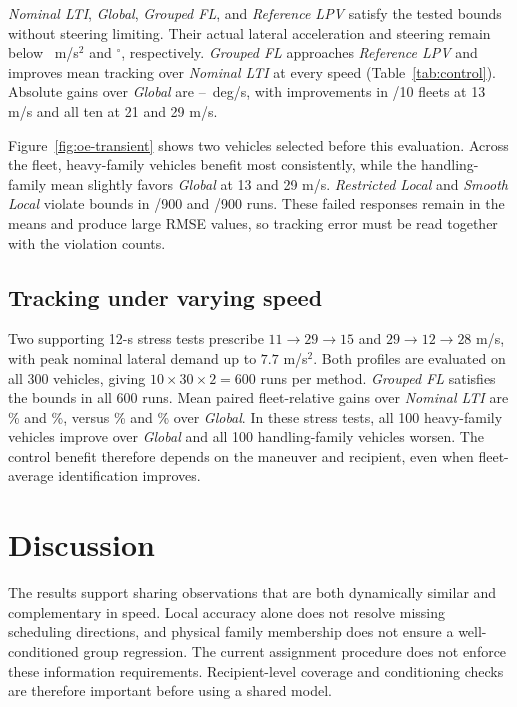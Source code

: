 \documentclass[conference]{IEEEtran}
\newcommand{\rev}[1]{\textcolor{revisiongreen}{#1}}
\newcommand{\revred}[1]{\textcolor{revisionred}{#1}}
\newcommand{\method}[1]{\textit{#1}}
\newcommand{\RestrictedLocal}{\method{Restricted Local}}
\newcommand{\SmoothLocal}{\method{Smooth Local}}
\newcommand{\GlobalModel}{\method{Global}}
\newcommand{\GroupedFL}{\method{Grouped FL}}
\newcommand{\NominalLTI}{\method{Nominal LTI}}
\newcommand{\ReferenceLPV}{\method{Reference LPV}}
\begin{document}
\NominalLTI{}, \GlobalModel{}, \rev{\GroupedFL{}}, and \rev{\ReferenceLPV{}} satisfy
the \rev{tested} bounds without \rev{steering} limiting. \rev{Their} actual lateral acceleration
and steering remain below \OETransientPeakAccelerationBound~m/s$^2$ and
\OETransientPeakSteeringBound$^\circ$, respectively.
\rev{\GroupedFL{}} approaches \rev{\ReferenceLPV{}} and improves mean tracking over
\NominalLTI{} at every speed (Table~\ref{tab:control}). \rev{Absolute gains} over
\GlobalModel{} are \OETransientGlobalLowAbsolute--\OETransientGlobalHighAbsolute~deg/s,
\rev{with improvements} in \OETransientGlobalLowFleetWins/10 fleets at 13 m/s
and all ten at 21 and 29 m/s.

Figure~\ref{fig:oe-transient} \rev{shows} two \rev{vehicles selected} before this evaluation.
\rev{Across the fleet, heavy-family} vehicles benefit most consistently, \rev{while} the
handling-family mean slightly favors \GlobalModel{} at 13 and 29 m/s.
\RestrictedLocal{} and \rev{\SmoothLocal{}} violate bounds in
\OETransientRestrictedTotalViolations/900 and
\OETransientSmoothTotalViolations/900 runs. \rev{These failed responses remain
in the} means \rev{and produce large RMSE values, so tracking error must be read
together with the violation counts}.

\subsection{\rev{Tracking under varying} speed}
Two supporting 12-s \rev{stress} tests prescribe $11\to29\to15$ and
$29\to12\to28$ m/s, with peak nominal lateral demand up to $7.7$ m/s$^2$.
\revred{Both profiles are evaluated on all 300 vehicles, giving
$10\times30\times2=600$ runs per method.} \rev{\GroupedFL{} satisfies} the bounds
in all 600 \rev{runs}.
Mean paired fleet-relative gains over \NominalLTI{} are
\OECtrlNominalModerateGain\% and \OECtrlNominalHardGain\%, versus
\OECtrlGlobalModerateGain\% and \OECtrlGlobalHardGain\% over \GlobalModel{}.
\rev{In} these stress tests, all 100 heavy-family \rev{vehicles} improve over
\GlobalModel{} and all 100 handling-family \rev{vehicles} worsen.
\rev{The control benefit therefore depends on the maneuver and} recipient,
\rev{even when fleet-average identification improves}.
\endgroup

\section{\rev{Discussion}}
\begingroup
\rev{The results support sharing observations that are both dynamically similar
and complementary in speed. Local accuracy alone does not resolve missing
scheduling directions, and physical family membership does not ensure a
well-conditioned group regression. The current assignment procedure does
not enforce these information requirements. Recipient-level coverage and
conditioning checks are therefore important before using a shared model}.
\end{document}
